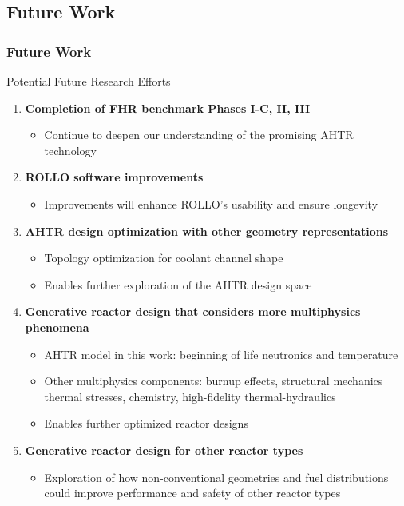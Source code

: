 \subsection{Future Work}
\begin{frame}
    \frametitle{Future Work}
    \vspace{-0.2cm}
    \begin{block}{Potential Future Research Efforts}
    \begin{enumerate}
        \item \textbf{Completion of FHR benchmark Phases I-C, II, III}
        \begin{itemize}
            \item Continue to deepen our understanding of the promising AHTR technology 
        \end{itemize}
        \item \textbf{ROLLO software improvements} 
            \begin{itemize}
                \item Improvements will enhance ROLLO's usability and ensure longevity
            \end{itemize}
        \item \textbf{AHTR design optimization with other geometry representations} 
            \begin{itemize}
                \item Topology optimization for coolant channel shape 
                \item Enables further exploration of the AHTR design space 
            \end{itemize}
        \item \textbf{Generative reactor design that considers more multiphysics phenomena} 
            \begin{itemize}
                \item AHTR model in this work: beginning of life neutronics and temperature 
                \item Other multiphysics components: burnup effects, structural mechanics 
                thermal stresses, chemistry, high-fidelity thermal-hydraulics 
                \item Enables further optimized reactor designs 
            \end{itemize}
        \item \textbf{Generative reactor design for other reactor types}
        \begin{itemize}
            \item Exploration of how non-conventional geometries and fuel distributions could 
            improve performance and safety of other reactor types 
        \end{itemize}
    \end{enumerate}
    \end{block}
\end{frame}